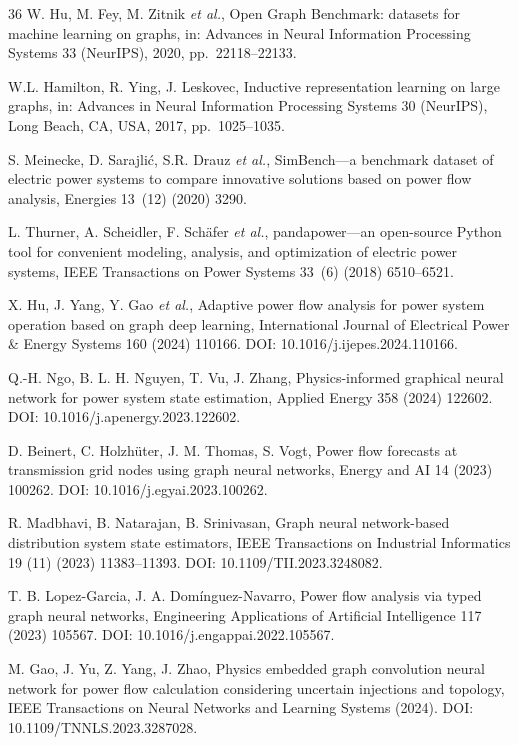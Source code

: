 \documentclass[preprint,review,12pt]{elsarticle}
\begin{document}
\begin{thebibliography}{36}
 W. Hu, M. Fey, M. Zitnik \emph{et al.}, Open Graph Benchmark: datasets for machine learning on graphs, in: Advances in Neural Information Processing Systems 33 (NeurIPS), 2020, pp.~22118--22133.

 W.L. Hamilton, R. Ying, J. Leskovec, Inductive representation learning on large graphs, in: Advances in Neural Information Processing Systems 30 (NeurIPS), Long Beach, CA, USA, 2017, pp.~1025--1035.

 S. Meinecke, D. Sarajli\'{c}, S.R. Drauz \emph{et al.}, SimBench---a benchmark dataset of electric power systems to compare innovative solutions based on power flow analysis, Energies 13~(12) (2020) 3290.

 L. Thurner, A. Scheidler, F. Sch\"{a}fer \emph{et al.}, pandapower---an open-source Python tool for convenient modeling, analysis, and optimization of electric power systems, IEEE Transactions on Power Systems 33~(6) (2018) 6510--6521.

 X. Hu, J. Yang, Y. Gao \emph{et al.}, Adaptive power flow analysis for power system operation based on graph deep learning, International Journal of Electrical Power \& Energy Systems 160 (2024) 110166. DOI: 10.1016/j.ijepes.2024.110166.

 Q.-H. Ngo, B. L. H. Nguyen, T. Vu, J. Zhang, Physics-informed graphical neural network for power system state estimation, Applied Energy 358 (2024) 122602. DOI: 10.1016/j.apenergy.2023.122602.

 D. Beinert, C. Holzh\"{u}ter, J. M. Thomas, S. Vogt, Power flow forecasts at transmission grid nodes using graph neural networks, Energy and AI 14 (2023) 100262. DOI: 10.1016/j.egyai.2023.100262.

 R. Madbhavi, B. Natarajan, B. Srinivasan, Graph neural network-based distribution system state estimators, IEEE Transactions on Industrial Informatics 19 (11) (2023) 11383--11393. DOI: 10.1109/TII.2023.3248082.

 T. B. Lopez-Garcia, J. A. Dom\'{i}nguez-Navarro, Power flow analysis via typed graph neural networks, Engineering Applications of Artificial Intelligence 117 (2023) 105567. DOI: 10.1016/j.engappai.2022.105567.

 M. Gao, J. Yu, Z. Yang, J. Zhao, Physics embedded graph convolution neural network for power flow calculation considering uncertain injections and topology, IEEE Transactions on Neural Networks and Learning Systems (2024). DOI: 10.1109/TNNLS.2023.3287028.


\end{thebibliography}
\end{document}

